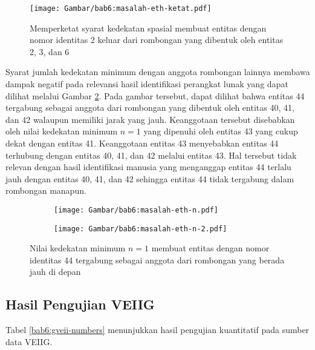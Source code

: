 \begin{figure}[h]
    \centering
    \captionsetup{width=0.6\textwidth}
    \texttt{[image: Gambar/bab6:masalah-eth-ketat.pdf]}
    \caption[Dampak ketatnya syarat kedekatan spasial pada data ETH]{Memperketat syarat kedekatan spasial membuat entitas dengan nomor identitas 2 keluar dari rombongan yang dibentuk oleh entitas 2, 3, dan 6}
    \label{bab6:masalah-syarat-ketat-eth}
\end{figure}

Syarat jumlah kedekatan minimum dengan anggota rombongan lainnya membawa dampak negatif pada relevansi hasil identifikasi perangkat lunak yang dapat dilihat melalui Gambar \ref{bab6:masalah-eth-n}. Pada gambar tersebut, dapat dilihat bahwa entitas 44 tergabung sebagai anggota dari rombongan yang dibentuk oleh entitas 40, 41, dan 42 walaupun memiliki jarak yang jauh. Keanggotaan tersebut disebabkan oleh nilai kedekatan minimum $n = 1$ yang dipenuhi oleh entitas 43 yang cukup dekat dengan entitas 41. Keanggotaan entitas 43 menyebabkan entitas 44 terhubung dengan entitas 40, 41, dan 42 melalui entitas 43. Hal tersebut tidak relevan dengan hasil identifikasi manusia yang menganggap entitas 44 terlalu jauh dengan entitas 40, 41, dan 42 sehingga entitas 44 tidak tergabung dalam rombongan manapun.

\begin{figure}[t]
    \centering
    \captionsetup{width=.65\textwidth}
    \begin{subfigure}[t]{0.225\textwidth}
        \centering
        \texttt{[image: Gambar/bab6:masalah-eth-n.pdf]}
    \end{subfigure}
    \begin{subfigure}[t]{0.225\textwidth}
        \centering
        \texttt{[image: Gambar/bab6:masalah-eth-n-2.pdf]}
    \end{subfigure}
    \caption[Masalah nilai $n$ pada data BIWI ETH]{Nilai kedekatan minimum $n = 1$ membuat entitas dengan nomor identitas 44 tergabung sebagai anggota dari rombongan yang berada jauh di depan}
    \label{bab6:masalah-eth-n}
\end{figure}
 
\subsection{Hasil Pengujian VEIIG}
\label{subsec:veiig-result}

Tabel \ref{bab6:gveii-numbers} menunjukkan hasil pengujian kuantitatif pada sumber data VEIIG.

